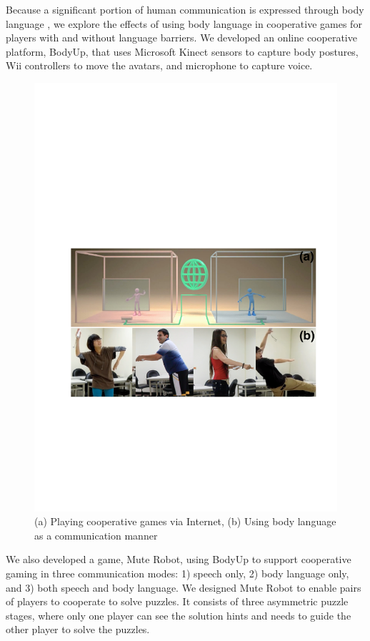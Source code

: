 Because a significant portion of human communication is expressed through body language \cite{7-percent-rule}, we explore the effects of using body language in cooperative games for players with and without language barriers. We developed an online cooperative platform, BodyUp, that uses Microsoft Kinect sensors to capture body postures, Wii controllers to move the avatars, and microphone to capture voice. 

\begin{figure}[t]
\centering
\includegraphics[width=0.9\columnwidth]{Figures/Topic.pdf}
\caption{(a) Playing cooperative games via Internet, (b) Using body language as a communication manner}
\label{fig:Topic}
\end{figure}

We also developed a game, Mute Robot, using BodyUp to support cooperative gaming in three communication modes: 1) speech only, 2) body language only, and 3) both speech and body language. We designed Mute Robot to enable pairs of players to cooperate to solve puzzles. It consists of three asymmetric puzzle stages, where only one player can see the solution hints and needs to guide the other player to solve the puzzles.


